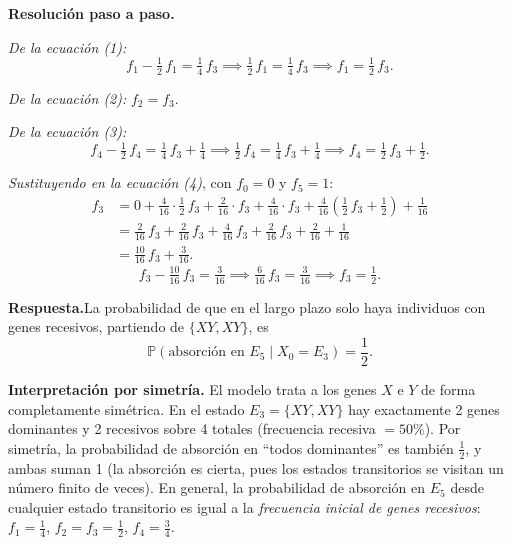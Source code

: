 \documentclass[10pt,a4paper]{article}
\newcommand{\Prob}[1]{\mathbb{P}\!\left(#1\right)}
\newenvironment{nota}{\begin{tcolorbox}[notebox]}{\end{tcolorbox}}
\begin{document}
\medskip
\textbf{Resoluci\'on paso a paso.}

\noindent\textit{De la ecuaci\'on (1):}
\[
  f_1 - \tfrac{1}{2}\,f_1 = \tfrac{1}{4}\,f_3 \implies
  \tfrac{1}{2}\,f_1 = \tfrac{1}{4}\,f_3 \implies
  \boxed{f_1 = \tfrac{1}{2}\,f_3.}
\]

\noindent\textit{De la ecuaci\'on (2):} $\boxed{f_2 = f_3.}$

\noindent\textit{De la ecuaci\'on (3):}
\[
  f_4 - \tfrac{1}{2}\,f_4 = \tfrac{1}{4}\,f_3 + \tfrac{1}{4} \implies
  \tfrac{1}{2}\,f_4 = \tfrac{1}{4}\,f_3 + \tfrac{1}{4} \implies
  \boxed{f_4 = \tfrac{1}{2}\,f_3 + \tfrac{1}{2}.}
\]

\noindent\textit{Sustituyendo en la ecuaci\'on (4)}, con $f_0=0$ y $f_5=1$:
\begin{align*}
  f_3 & = 0 + \tfrac{4}{16}\cdot\tfrac{1}{2}\,f_3
  + \tfrac{2}{16}\cdot f_3
  + \tfrac{4}{16}\cdot f_3
  + \tfrac{4}{16}\!\left(\tfrac{1}{2}\,f_3+\tfrac{1}{2}\right)
  + \tfrac{1}{16}                                                      \\[4pt]
      & = \tfrac{2}{16}\,f_3 + \tfrac{2}{16}\,f_3 + \tfrac{4}{16}\,f_3
  + \tfrac{2}{16}\,f_3 + \tfrac{2}{16} + \tfrac{1}{16}                 \\[4pt]
      & = \tfrac{10}{16}\,f_3 + \tfrac{3}{16}.
\end{align*}
\[
  f_3 - \tfrac{10}{16}\,f_3 = \tfrac{3}{16} \implies
  \tfrac{6}{16}\,f_3 = \tfrac{3}{16} \implies
  \boxed{f_3 = \tfrac{1}{2}.}
\]

\medskip
\textbf{Respuesta.}\quad La probabilidad de que en el largo plazo solo haya
individuos con genes recesivos, partiendo de $\{XY,XY\}$, es
\[
  \Prob{\text{absorci\'on en }E_5 \mid X_0 = E_3} = \dfrac{1}{2}.
\]

\begin{nota}
  \textbf{Interpretaci\'on por simetr\'ia.} El modelo trata a los genes $X$ e $Y$ de
  forma completamente sim\'etrica. En el estado $E_3 = \{XY,XY\}$ hay exactamente
  2 genes dominantes y 2 recesivos sobre 4 totales (frecuencia recesiva $= 50\%$).
  Por simetr\'ia, la probabilidad de absorci\'on en ``todos dominantes'' es tambi\'en
  $\tfrac{1}{2}$, y ambas suman 1 (la absorci\'on es cierta, pues los estados
  transitorios se visitan un n\'umero finito de veces). En general, la probabilidad
  de absorci\'on en $E_5$ desde cualquier estado transitorio es igual a la
  \emph{frecuencia inicial de genes recesivos}: $f_1=\tfrac{1}{4}$,
  $f_2=f_3=\tfrac{1}{2}$, $f_4=\tfrac{3}{4}$.
\end{nota}
\end{document}
